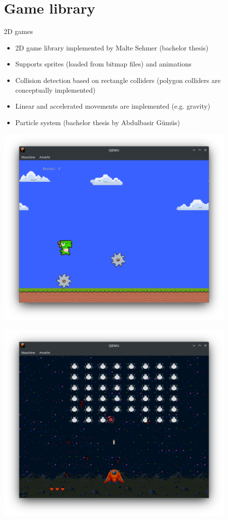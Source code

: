 \section{Game library}

\begin{frame}{2D games}
	\begin{itemize}
		\item 2D game library implemented by Malte Sehmer (bachelor thesis)
		\item Supports sprites (loaded from bitmap files) and animations
		\item Collision detection based on rectangle colliders (polygon colliders are conceptually implemented)
		\item Linear and accelerated movements are implemented (e.g. gravity)
		\item Particle system (bachelor thesis by Abdulbasir Gümüs)
	\end{itemize}
	\begin{minipage}{0.49\textwidth}
		\includegraphics[width=0.9\textwidth]{img/dino}
	\end{minipage}
	\begin{minipage}{0.49\textwidth}
	\includegraphics[width=0.9\textwidth]{img/bug}

\end{minipage}
\end{frame}
